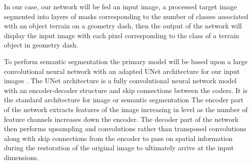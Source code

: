 \documentclass{article} %
\begin{document}
In our case, our network will be fed an input image, a processed target image segmented into layers of masks corresponding to the number of classes associated with an object terrain on a geometry dash, then the output of the network will display the input image with each pixel corresponding to the class of a terrain object in geometry dash. 

To perform semantic segmentation the primary model will be based upon a large convolutional neural network with an adapted UNet architecture for our input images \cite{ronneberger2015unetconvolutionalnetworksbiomedical}. The UNet architecture is a fully convolutional neural network model with an encoder-decoder structure and skip connections between the coders. It is the standard architecture for image or semantic segmentation The encoder part of the network extracts features of the image increasing in level as the number of feature channels increases down the encoder. The decoder part of the network then performs upsampling and convolutions rather than transposed convolutions along with skip connections from the encoder to pass on spatial information during the restoration of the original image to ultimately arrive at the input dimensions. 



\label{last_page}



\end{document}
